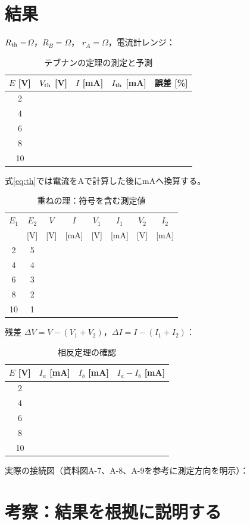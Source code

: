 \documentclass[lualatex,a4paper,10pt]{jlreq}
\begin{document}
\section{結果}\label{sec:auto5}
\noindent $R_{\rm th}=$\blank $\Omega$，$R_B=$\blank $\Omega$，
$r_A=$\blank $\Omega$，電流計レンジ：\blank
\begin{table}[h]\centering\caption{テブナンの定理の測定と予測}
\begin{tabular}{ccccc}\toprule $E$ [V]&$V_{\rm th}$ [V]&$I$ [mA]&$I_{\rm th}$ [mA]&誤差 [\%]\\\midrule
2&&&&\\4&&&&\\6&&&&\\8&&&&\\10&&&&\\\bottomrule\end{tabular}\end{table}
式\eqref{eq:th}では電流をAで計算した後にmAへ換算する。
\clearpage
\begin{table}[h]\centering\caption{重ねの理：符号を含む測定値}
\begin{tabular}{cccccccc}\toprule $E_1$&$E_2$&$V$&$I$&$V_1$&$I_1$&$V_2$&$I_2$\\
\relax [V]&[V]&[V]&[mA]&[V]&[mA]&[V]&[mA]\\\midrule
2&5&&&&&&\\4&4&&&&&&\\6&3&&&&&&\\8&2&&&&&&\\10&1&&&&&&\\\bottomrule\end{tabular}\end{table}
\noindent 残差 $\Delta V=V-(V_1+V_2)$，$\Delta I=I-(I_1+I_2)$：
\writing{15mm}
\begin{table}[h]\centering\caption{相反定理の確認}
\begin{tabular}{cccc}\toprule $E$ [V]&$I_a$ [mA]&$I_b$ [mA]&$I_a-I_b$ [mA]\\\midrule
2&&&\\4&&&\\6&&&\\8&&&\\10&&&\\\bottomrule\end{tabular}\end{table}
\noindent 実際の接続図（資料図A-7、A-8、A-9を参考に測定方向を明示）：
\writing{25mm}
\clearpage\section{考察：結果を根拠に説明する}\label{sec:auto6}
\end{document}
